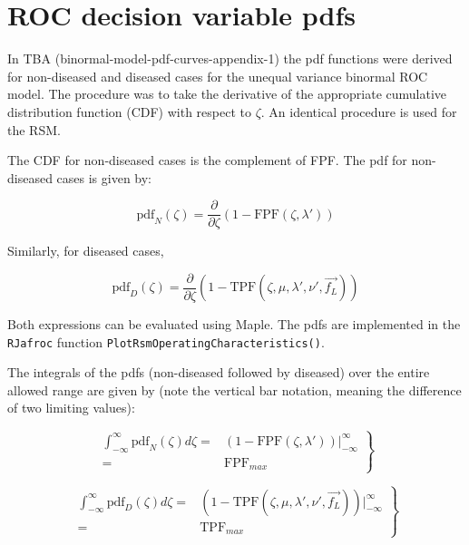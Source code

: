 \documentclass[
]{book}
\begin{document}
\hypertarget{rsm-pred-roc-curve-pdfs}{%
\section{ROC decision variable pdfs}\label{rsm-pred-roc-curve-pdfs}}

In TBA (binormal-model-pdf-curves-appendix-1) the pdf functions were derived for non-diseased and diseased cases for the unequal variance binormal ROC model. The procedure was to take the derivative of the appropriate cumulative distribution function (CDF) with respect to \(\zeta\). An identical procedure is used for the RSM.

The CDF for non-diseased cases is the complement of FPF. The pdf for non-diseased cases is given by:

\begin{equation}
\text{pdf}_N\left ( \zeta \right ) = \frac{\partial }{\partial \zeta} \left ( 1-\text{FPF}\left (\zeta , \lambda'\right ) \right ) 
\label{eq:rsm-pred-pdf-n}
\end{equation}

Similarly, for diseased cases,

\begin{equation}
\text{pdf}_D\left ( \zeta \right ) = \frac{\partial }{\partial \zeta} \left ( 1-\text{TPF}\left (\zeta , \mu, \lambda', \nu', \overrightarrow{f_L} \right ) \right ) 
\label{eq:rsm-pred-pdf-d}
\end{equation}

Both expressions can be evaluated using Maple. The pdfs are implemented in the \texttt{RJafroc} function \texttt{PlotRsmOperatingCharacteristics()}.

The integrals of the pdfs (non-diseased followed by diseased) over the entire allowed range are given by (note the vertical bar notation, meaning the difference of two limiting values):

\begin{equation}
\left. 
\begin{aligned}
\int_{-\infty}^{\infty}\text{pdf}_N \left ( \zeta \right )d \zeta =& \left ( 1-\text{FPF}\left (\zeta , \lambda'\right ) \right ) \bigg \rvert_{-\infty}^{\infty}\\
=& \text{FPF}_{max}
\end{aligned}
\right \}
\label{eq:rsm-pred-int-pdf-n}
\end{equation}

\begin{equation}
\left. 
\begin{aligned}
\int_{-\infty}^{\infty}\text{pdf}_D \left ( \zeta \right )d \zeta =& \left ( 1-\text{TPF}\left (\zeta , \mu, \lambda', \nu', \overrightarrow{f_L} \right ) \right ) \bigg \rvert_{-\infty}^{\infty}\\
=& \text{TPF}_{max}
\end{aligned}
\right \}
\label{eq:rsm-pred-int-pdf-d}
\end{equation}
\end{document}
